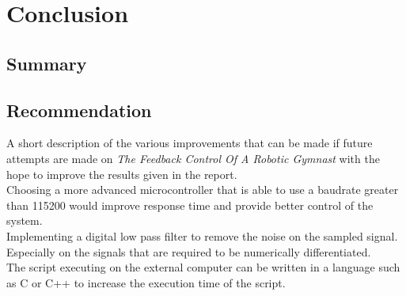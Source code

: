 \chapter{Conclusion}
\label{chp:conclusion}



\section{Summary}

\section{Recommendation}
A short description of the various improvements that can be made if future attempts are made on \textit{The Feedback Control Of A Robotic Gymnast} with the hope to improve the results given in the report.\\

Choosing a more advanced microcontroller that is able to use a baudrate greater than 115200 would improve response time and provide better control of the system.\\

Implementing a digital low pass filter to remove the noise on the sampled signal. Especially on the signals that are required to be numerically differentiated.\\

The script executing on the external computer can be written in a language such as C or C++ to increase the execution time of the script.\\

\newpage
